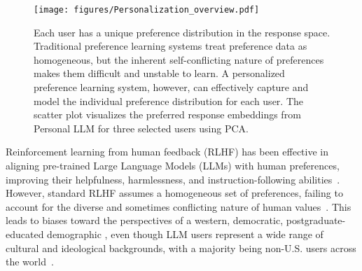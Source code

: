 \begin{figure*}[htbp!]
\centering
\vspace{-6mm}
\texttt{[image: figures/Personalization\_overview.pdf]}
\caption{Each user has a unique preference distribution in the response space. Traditional preference learning systems treat preference data as homogeneous, but the inherent self-conflicting nature of preferences makes them difficult and unstable to learn. A personalized preference learning system, however, can effectively capture and model the individual preference distribution for each user. The scatter plot visualizes the preferred response embeddings from Personal LLM \citep{zollo_personalllm_2024} for three selected users using PCA.}
\label{illustration}
\vspace{-0.4cm}
\end{figure*}




Reinforcement learning from human feedback (RLHF) has been effective in aligning pre-trained Large Language Models (LLMs) with human preferences, improving their helpfulness, harmlessness, and instruction-following abilities~\cite{NEURIPS2022_b1efde53}. However, standard RLHF assumes a homogeneous set of preferences, failing to account for the diverse and sometimes conflicting nature of human values~\cite{casper2023open}. This leads to biases toward the perspectives of a western, democratic, postgraduate-educated demographic \citep{santurkar_whose_2023}, even though LLM users represent a wide range of cultural and ideological backgrounds, with a majority being non-U.S. users across the world~\cite{liu2023who}.

